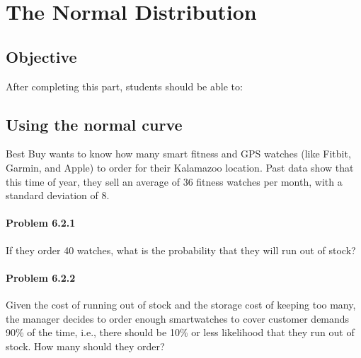 \documentclass[11pt]{book}\usepackage[]{graphicx}\usepackage[]{color}
\begin{document}
\onecolumn



\chapter{The Normal Distribution}
\label{chap:ch6}

\section{Objective}

After completing this part, students should be able to:


\section{Using the normal curve} 

Best Buy wants to know how many smart fitness and GPS watches (like Fitbit, Garmin, and Apple) to order for their Kalamazoo location. Past data show that this time of year, they sell an average of 36 fitness watches per month, with a standard deviation of 8.

\subsubsection{Problem 6.2.1}  If they order 40 watches, what is the probability that they will run out of stock?

\subsubsection{Problem 6.2.2}  \label{LBL622} Given the cost of running out of stock and the storage cost of keeping too many, the manager decides to order enough smartwatches to cover customer demands 90\% of the time, i.e., there should be 10\% or less likelihood that they run out of stock. How many should they order?
\end{document}
